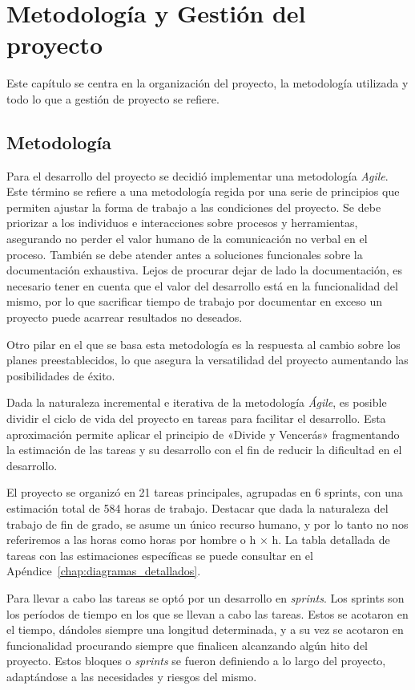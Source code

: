 \chapter{Metodología y Gestión del proyecto}
\label{chap:mygp}
Este capítulo se centra en la organización del proyecto, la metodología utilizada y todo lo que a gestión de proyecto se refiere.
\section{Metodología}
Para el desarrollo del proyecto se decidió implementar una metodología \textit{Agile}. Este término se refiere a una metodología regida por una serie de principios que permiten ajustar la forma de trabajo a las condiciones del proyecto. Se debe priorizar a los individuos e interacciones sobre procesos y herramientas, asegurando no perder el valor humano de la comunicación no verbal en el proceso. También se debe atender antes a soluciones funcionales sobre la documentación exhaustiva. Lejos de procurar dejar de lado la documentación, es necesario tener en cuenta que el valor del desarrollo está en la funcionalidad del mismo, por lo que sacrificar tiempo de trabajo por documentar en exceso un proyecto puede acarrear resultados no deseados.

Otro pilar en el que se basa esta metodología es la respuesta al cambio sobre los planes preestablecidos, lo que asegura la versatilidad del proyecto aumentando las posibilidades de éxito.

Dada la naturaleza incremental e iterativa de la metodología \textit{Ágile}, es posible dividir el ciclo de vida del proyecto en tareas para facilitar el desarrollo. Esta aproximación permite aplicar el principio de «Divide y Vencerás» fragmentando la estimación de las tareas y su desarrollo con el fin de reducir la dificultad en el desarrollo. 

El proyecto se organizó en 21 tareas principales, agrupadas en 6 sprints, con una estimación total de 584 horas de trabajo. Destacar que dada la naturaleza del trabajo de fin de grado, se asume un único recurso humano, y por lo tanto no nos referiremos a las horas como horas por hombre o h × h. La tabla detallada de tareas con las estimaciones específicas se puede consultar en el Apéndice~\ref{chap:diagramas_detallados}.

Para llevar a cabo las tareas se optó por un desarrollo en \textit{sprints}. Los sprints son los períodos de tiempo en los que se llevan a cabo las tareas. Estos se acotaron en el tiempo, dándoles siempre una longitud determinada, y a su vez se acotaron en funcionalidad procurando siempre que finalicen alcanzando algún hito del proyecto. Estos bloques o \textit{sprints} se fueron definiendo a lo largo del proyecto, adaptándose a las necesidades y riesgos del mismo.

